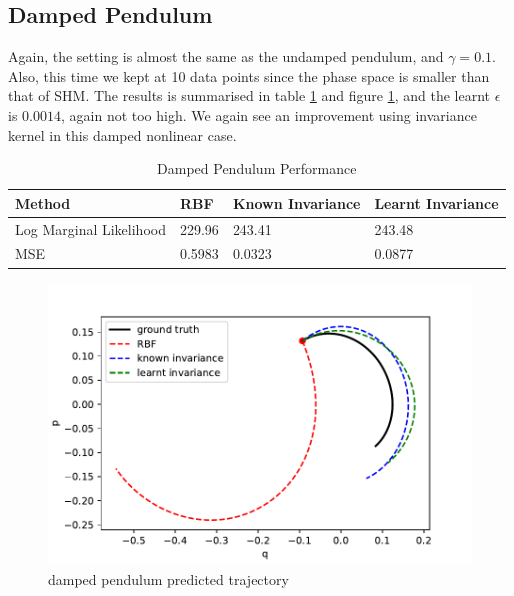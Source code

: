\documentclass{statsmsc}
\begin{document}
\subsection{Damped Pendulum}
Again, the setting is almost the same as the undamped pendulum, and $\gamma=0.1$. 
Also, this time we kept at 10 data points since the phase space is smaller than that of SHM. 
The results is summarised in table \ref{tab:damped_pendulum_performance} and figure \ref{fig:damped_pendulum_prediction}, and the learnt $\epsilon$ is $0.0014$, again not too high.
We again see an improvement using invariance kernel in this damped nonlinear case. 

\begin{table}[H]
  \centering
  \begin{tabular}{l l l l}
    \hline
Method           & RBF & Known Invariance&  Learnt Invariance\\
  \hline
Log Marginal Likelihood & 229.96 & 243.41 & 243.48  \\
MSE & 0.5983 & 0.0323 & 0.0877 \\
    \hline
  \end{tabular}
  \caption{Damped Pendulum Performance}
  \label{tab:damped_pendulum_performance}
\end{table}

\begin{figure}[H]
        \centering
        \includegraphics[width=\linewidth]{../codes/figures/damped_pendulum_predicted.pdf}
        \caption{damped pendulum predicted trajectory}
        \label{fig:damped_pendulum_prediction}
\end{figure}
\end{document}
